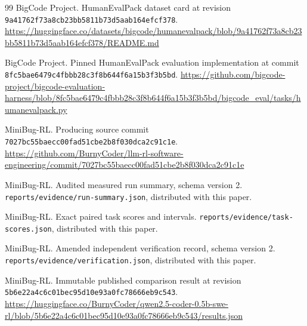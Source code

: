 \documentclass[11pt]{article}
\begin{document}
{\begin{thebibliography}{99}
BigCode Project.
\newblock HumanEvalPack dataset card at revision
\texttt{9a41762f73a8cb23bb5811b73d5aab164efcf378}.
\newblock \url{https://huggingface.co/datasets/bigcode/humanevalpack/blob/9a41762f73a8cb23bb5811b73d5aab164efcf378/README.md}

BigCode Project.
\newblock Pinned HumanEvalPack evaluation implementation at commit
\texttt{8fc5bae6479c4fbbb28c3f8b644f6a15b3f3b5bd}.
\newblock \url{https://github.com/bigcode-project/bigcode-evaluation-harness/blob/8fc5bae6479c4fbbb28c3f8b644f6a15b3f3b5bd/bigcode_eval/tasks/humanevalpack.py}

MiniBug-RL.
\newblock Producing source commit
\texttt{7027bc55baecc00fad51cbe2b8f030dca2c91c1e}.
\newblock \url{https://github.com/BurnyCoder/llm-rl-software-engineering/commit/7027bc55baecc00fad51cbe2b8f030dca2c91c1e}

MiniBug-RL.
\newblock Audited measured run summary, schema version 2.
\newblock \texttt{reports/evidence/run-summary.json}, distributed with this paper.

MiniBug-RL.
\newblock Exact paired task scores and intervals.
\newblock \texttt{reports/evidence/task-scores.json}, distributed with this paper.

MiniBug-RL.
\newblock Amended independent verification record, schema version 2.
\newblock \texttt{reports/evidence/verification.json}, distributed with this paper.

MiniBug-RL.
\newblock Immutable published comparison result at revision
\texttt{5b6e22a4c6c01bec95d10e93a0fc78666eb9c543}.
\newblock \url{https://huggingface.co/BurnyCoder/qwen2.5-coder-0.5b-swe-rl/blob/5b6e22a4c6c01bec95d10e93a0fc78666eb9c543/results.json}

\end{thebibliography}
}
\end{document}
